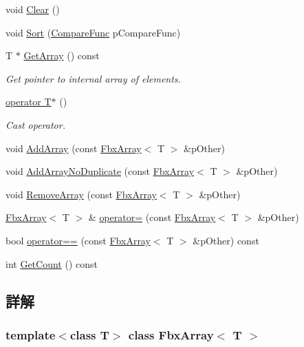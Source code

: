 \begin{DoxyCompactItemize}
\item 
void \hyperlink{class_fbx_array_afeb2b8c53e6364a2d7a82b7a9f7de75f}{Clear} ()
\item 
void \hyperlink{class_fbx_array_ab4bd11584ad0175022c04d817366ecba}{Sort} (\hyperlink{class_fbx_array_a3f251a5b7314e26facb298dcf3856557}{Compare\+Func} p\+Compare\+Func)
\item 
T $\ast$ \hyperlink{class_fbx_array_a3ac872b6e74391897a028bc87f823979}{Get\+Array} () const
\begin{DoxyCompactList}\small\item\em Get pointer to internal array of elements. \end{DoxyCompactList}\item 
\hyperlink{class_fbx_array_a5fcff5619e7e4348158f5adcfeee10ff}{operator T$\ast$} ()
\begin{DoxyCompactList}\small\item\em Cast operator. \end{DoxyCompactList}\item 
void \hyperlink{class_fbx_array_a741247b39ad378a6fbdae4377c718461}{Add\+Array} (const \hyperlink{class_fbx_array}{Fbx\+Array}$<$ T $>$ \&p\+Other)
\item 
void \hyperlink{class_fbx_array_a12a12c9c36c424bd880ae0f716d5efe7}{Add\+Array\+No\+Duplicate} (const \hyperlink{class_fbx_array}{Fbx\+Array}$<$ T $>$ \&p\+Other)
\item 
void \hyperlink{class_fbx_array_a3884ec0b5b7eacf3fd636f9dfd77e619}{Remove\+Array} (const \hyperlink{class_fbx_array}{Fbx\+Array}$<$ T $>$ \&p\+Other)
\item 
\hyperlink{class_fbx_array}{Fbx\+Array}$<$ T $>$ \& \hyperlink{class_fbx_array_a44222dea1bbe2627872dce87b633dcb5}{operator=} (const \hyperlink{class_fbx_array}{Fbx\+Array}$<$ T $>$ \&p\+Other)
\item 
bool \hyperlink{class_fbx_array_ad0e83571bb944be38ce3bba7079be185}{operator==} (const \hyperlink{class_fbx_array}{Fbx\+Array}$<$ T $>$ \&p\+Other) const
\item 
int \hyperlink{class_fbx_array_a7a47b85464e00634fb9fce26409c7d2a}{Get\+Count} () const
\end{DoxyCompactItemize}


\subsection{詳解}
\subsubsection*{template$<$class T$>$\newline
class Fbx\+Array$<$ T $>$}

